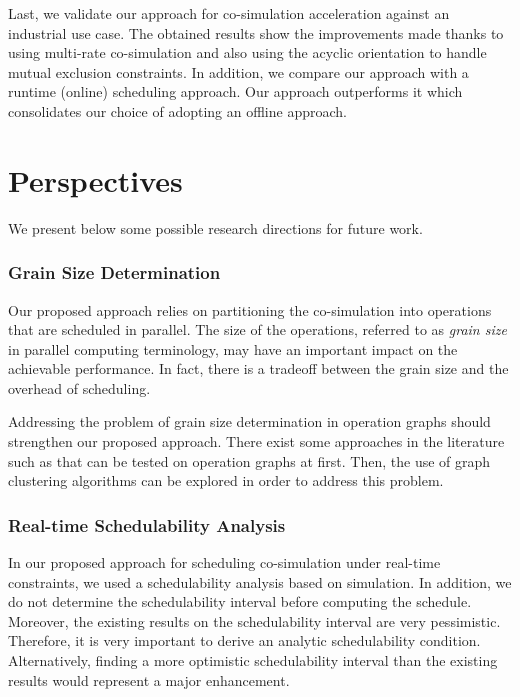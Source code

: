 Last, we validate our approach for co-simulation acceleration against an industrial use case. The obtained results show the improvements made thanks to using multi-rate co-simulation and also using the acyclic orientation to handle mutual exclusion constraints. In addition, we compare our approach with a runtime (online) scheduling approach. Our approach outperforms it which consolidates our choice of adopting an offline approach.               

\section{Perspectives}

We present below some possible research directions for future work.

\subsubsection{Grain Size Determination}

Our proposed approach relies on partitioning the co-simulation into operations that are scheduled in parallel. The size of the operations, referred to as \textit{grain size} in parallel computing terminology, may have an important impact on the achievable performance. In fact, there is a tradeoff between the grain size and the overhead of scheduling.

Addressing the problem of grain size determination in operation graphs should strengthen our proposed approach. There exist some approaches in the literature such as \cite{kruatrachue:1988} that can be tested on operation graphs at first. Then, the use of graph clustering algorithms can be explored in order to address this problem. 

\subsubsection{Real-time Schedulability Analysis}

In our proposed approach for scheduling co-simulation under real-time constraints, we used a schedulability analysis based on simulation. In addition, we do not determine the schedulability interval before computing the schedule. Moreover, the existing results on the schedulability interval are very pessimistic. Therefore, it is very important to derive an analytic schedulability condition. Alternatively, finding a more optimistic schedulability interval than the existing results would represent a major enhancement.  